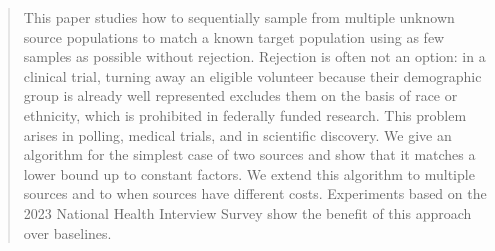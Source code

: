 \documentclass[twoside]{article}
\begin{document}
%

%


\begin{abstract}
  This paper studies how to sequentially sample from multiple unknown source populations to match a known target population using as few samples as possible without rejection. Rejection is often not an option: in a clinical trial, turning away an eligible volunteer because their demographic group is already well represented excludes them on the basis of race or ethnicity, which is prohibited in federally funded research. This problem arises in polling, medical trials, and in scientific discovery. We give an algorithm for the simplest case of two sources and show that it matches a lower bound up to constant factors. We extend this algorithm to multiple sources and to when sources have different costs. Experiments based on the 2023 National Health Interview Survey show the benefit of this approach over baselines.
\end{abstract}
\end{document}
